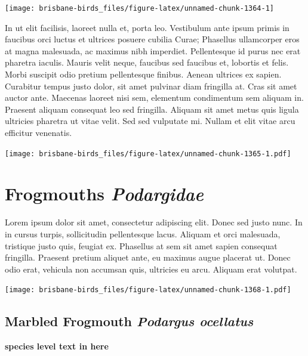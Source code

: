 \documentclass[]{book}
\let\origfigure\figure
\let\endorigfigure\endfigure
\renewenvironment{figure}[1][2] {
  \expandafter\origfigure\expandafter[H]
} {
  \endorigfigure
}
\begin{document}
\begin{figure}
\texttt{[image: brisbane-birds\_files/figure-latex/unnamed-chunk-1364-1]} \caption{insert figure caption}\label{fig:unnamed-chunk-1364}
\end{figure}

In ut elit facilisis, laoreet nulla et, porta leo. Vestibulum ante ipsum
primis in faucibus orci luctus et ultrices posuere cubilia Curae;
Phasellus ullamcorper eros at magna malesuada, ac maximus nibh
imperdiet. Pellentesque id purus nec erat pharetra iaculis. Mauris velit
neque, faucibus sed faucibus et, lobortis et felis. Morbi suscipit odio
pretium pellentesque finibus. Aenean ultrices ex sapien. Curabitur
tempus justo dolor, sit amet pulvinar diam fringilla at. Cras sit amet
auctor ante. Maecenas laoreet nisi sem, elementum condimentum sem
aliquam in. Praesent aliquam consequat leo sed fringilla. Aliquam sit
amet metus quis ligula ultricies pharetra ut vitae velit. Sed sed
vulputate mi. Nullam et elit vitae arcu efficitur venenatis.

\begin{figure}
\centering
\texttt{[image: brisbane-birds\_files/figure-latex/unnamed-chunk-1365-1.pdf]}
\caption{\label{fig:unnamed-chunk-1365}insert figure caption}
\end{figure}

\chapter{\texorpdfstring{Frogmouths
\emph{Podargidae}}{Frogmouths Podargidae}}\label{frogmouths-podargidae}

Lorem ipsum dolor sit amet, consectetur adipiscing elit. Donec sed justo
nunc. In in cursus turpis, sollicitudin pellentesque lacus. Aliquam et
orci malesuada, tristique justo quis, feugiat ex. Phasellus at sem sit
amet sapien consequat fringilla. Praesent pretium aliquet ante, eu
maximus augue placerat ut. Donec odio erat, vehicula non accumsan quis,
ultricies eu arcu. Aliquam erat volutpat.

\texttt{[image: brisbane-birds\_files/figure-latex/unnamed-chunk-1368-1.pdf]}

\section{\texorpdfstring{Marbled Frogmouth \emph{Podargus
ocellatus}}{Marbled Frogmouth Podargus ocellatus}}\label{marbled-frogmouth-podargus-ocellatus}

\textbf{species level text in here}
\end{document}
